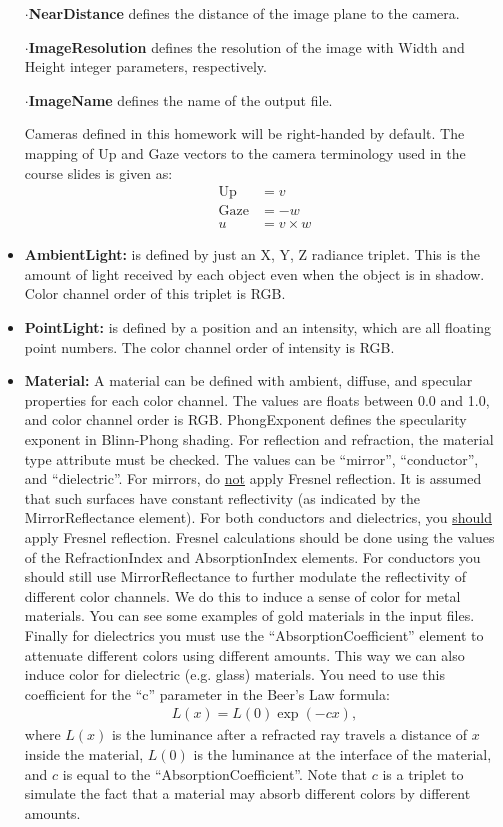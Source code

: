 \documentclass[12pt]{article}
\begin{document}
\begin{itemize}
$\cdot$\textbf{NearDistance} defines the distance of the image plane to 
the camera.

$\cdot$\textbf{ImageResolution} defines the resolution of the image with
Width and Height integer parameters, respectively.

$\cdot$\textbf{ImageName} defines the name  of  the  output file.

\noindent Cameras defined in this homework will be right-handed by
default. The mapping of Up and Gaze vectors to the camera terminology
used in the course slides is given as:
%
\begin{align*}
\text{Up} &= v\\
\text{Gaze} &= -w\\
u &= v \times w
\end{align*}
%
\item \textbf{AmbientLight:}  is defined by just an X, Y, Z radiance
triplet. This is the amount of light received by each object even when
the object is in shadow. Color channel order of this triplet is RGB.

\item \textbf{PointLight:} is defined by a position and an intensity,
    which are all floating point numbers. The color channel order of
    intensity is RGB.

\item \textbf{Material:} A material can be defined with ambient,
diffuse, and specular properties for each color
channel. The values are floats between 0.0 and 1.0, and color
channel order is RGB. PhongExponent defines the specularity
exponent in Blinn-Phong shading. For reflection and refraction, 
the material type attribute must be checked. The values can be
``mirror'', ``conductor'', and ``dielectric''. For mirrors, do
\underline{not} apply
Fresnel reflection. It is assumed that such surfaces have
constant reflectivity (as indicated by the MirrorReflectance
        element). For both conductors and dielectrics, you
\underline{should} apply Fresnel reflection. Fresnel calculations
should be done using the values of the RefractionIndex and
AbsorptionIndex elements.
For conductors you should still
use MirrorReflectance to further modulate the reflectivity of
different color channels. We do this to induce a sense of color
for metal materials. You can see some examples of gold materials
in the input files. Finally for dielectrics you must use the
``AbsorptionCoefficient'' element to attenuate different colors
using different amounts. This way we can also induce color for
dielectric (e.g. glass) materials. You need to use this
coefficient for the ``c'' parameter in the Beer's Law formula:
%
\begin{align*}
L(x) = L(0)\exp(-cx),
\end{align*}
%
where $L(x)$ is the luminance after a refracted ray travels a distance
of $x$ inside the material, $L(0)$ is the luminance at the interface of the
material, and $c$ is equal to the ``AbsorptionCoefficient''. Note that
$c$ is a triplet to simulate the fact that a material may absorb different
colors by different amounts.


\end{itemize}
\end{document}
